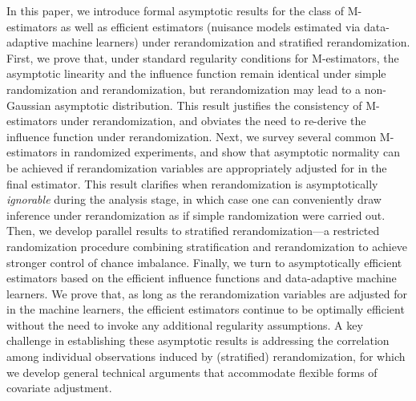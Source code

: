 \documentclass[12pt]{article}
\begin{document}
In this paper, we introduce formal asymptotic results for the class of M-estimators as well as efficient estimators (nuisance models estimated via data-adaptive machine learners) under rerandomization and stratified rerandomization. First, we prove that, under standard regularity conditions for M-estimators, the asymptotic linearity and the influence function remain identical under simple randomization and rerandomization, but rerandomization may lead to a non-Gaussian asymptotic distribution. This result justifies the consistency of M-estimators under rerandomization, and obviates the need to re-derive the influence function under rerandomization. Next, we survey several common M-estimators in randomized experiments, and show that asymptotic normality can be achieved if rerandomization variables are appropriately adjusted for in the final estimator. This result clarifies when rerandomization is asymptotically \emph{ignorable} during the analysis stage, in which case one can conveniently draw inference under rerandomization as if simple randomization were carried out. Then, we develop parallel results to stratified rerandomization---a restricted randomization procedure combining stratification and rerandomization to achieve stronger control of chance imbalance. Finally, we turn to asymptotically efficient estimators based on the efficient influence functions and data-adaptive machine learners. 
We prove that, as long as the rerandomization variables are adjusted for in the machine learners, the efficient estimators continue to be optimally efficient without the need to invoke any additional regularity assumptions.
A key challenge in establishing these asymptotic results is addressing the correlation among individual observations induced by (stratified) rerandomization, for which we develop general technical arguments that accommodate flexible forms of covariate adjustment.

\end{document}
